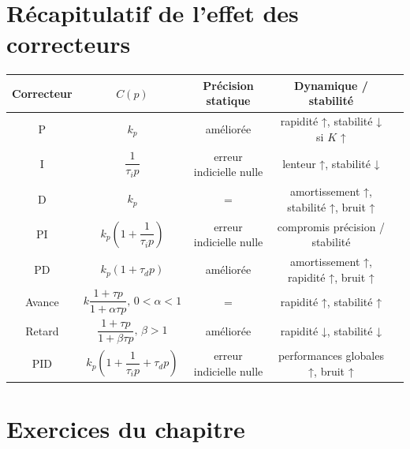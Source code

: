 \section{Récapitulatif de l'effet des correcteurs}
\begin{center}
\renewcommand{\arraystretch}{1.1}
\begin{tabular}{|c|c|c|c|c|}
\hline
Correcteur & $C(p)$ & Précision statique & Dynamique / stabilité \\
\hline
P      & $k_p$ & améliorée & rapidité ↑, stabilité ↓ si $K$ ↑ \\
I      & $\dfrac{1}{\tau_ip}$ & erreur indicielle nulle 
       & lenteur ↑, stabilité ↓ \\
D      & $k_p$ & = & amortissement ↑, stabilité ↑, bruit ↑ \\
PI     & $k_p\!\left(1+\dfrac{1}{\tau_i p}\right)$ & erreur indicielle nulle 
       & compromis précision / stabilité \\
PD     & $k_p(1+\tau_d p)$ & améliorée & amortissement ↑, rapidité ↑, bruit ↑ \\
Avance & $k\dfrac{1+\tau p}{1+\alpha \tau p},\,0<\alpha<1$ & = 
       & rapidité ↑, stabilité ↑ \\
Retard & $\dfrac{1+\tau p}{1+\beta \tau p},\,\beta>1$ & améliorée & 
         rapidité ↓, stabilité ↓ \\
PID    & $k_p\!\left(1+\dfrac{1}{\tau_i p}+\tau_d p\right)$ & 
         erreur indicielle nulle & performances globales ↑, bruit ↑ \\
\hline
\end{tabular}
\end{center}
\section{Exercices du chapitre}
\small

\setcounter{numexos}{0}
\normalsize
\newpage
\restoregeometry
\captionsetup{width=0.9\linewidth}
